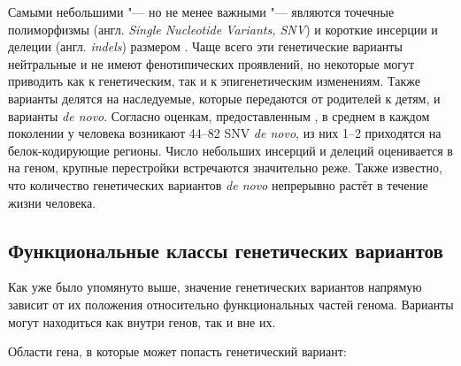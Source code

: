\documentclass[a4paper,14pt]{extarticle}
\newcommand{\engterm}[1]{англ. \textenglish{\textit{#1}}}
\begin{document}
Самыми небольшими "--- но не менее важными "--- являются точечные полиморфизмы (\engterm{Single Nucleotide Variants, SNV}) и короткие инсерции и делеции (\engterm{indels}) размером .
Чаще всего эти генетические варианты нейтральные и не имеют фенотипических проявлений, но некоторые могут приводить как к генетическим, так и к эпигенетическим изменениям.
Также варианты делятся на наследуемые, которые передаются от родителей к детям, и варианты \textit{de novo}.
Согласно оценкам, предоставленным \citet{Acuna_Hidalgo_2016}, в среднем в каждом поколении у человека возникают 44--82 SNV \textit{de novo}, из них 1--2 приходятся на белок-кодирующие регионы.
Число небольших инсерций и делеций оценивается в  на геном, крупные перестройки встречаются значительно реже.
Также известно, что количество генетических вариантов \textit{de novo} непрерывно растёт в течение жизни человека.

\subsection{Функциональные классы генетических вариантов}

Как уже было упомянуто выше, значение генетических вариантов напрямую зависит от их положения относительно функциональных частей генома.
Варианты могут находиться как внутри генов, так и вне их.

Области гена, в которые может попасть генетический вариант:
\end{document}
